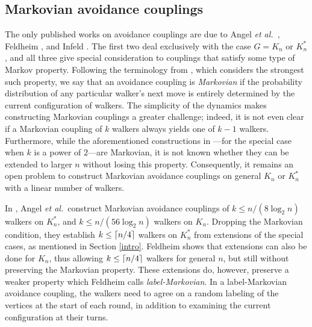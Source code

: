 \documentclass[11pt,reqno]{amsart} %
\numberwithin{equation}{section}
\theoremstyle{definition}
\DeclarePairedDelimiter\ceil{\lceil}{\rceil}
\begin{document}
\subsection{Markovian avoidance couplings} \label{Markovian}
The only published works on avoidance couplings are due to Angel \textit{et al.}~\cite{angel-holroyd-martin-wilson-winkler13}, Feldheim \cite{feldheim17}, and Infeld \cite{infeld16}.
The first two deal exclusively with the case $G = K_n$ or $K_n^*$, and all three give special consideration to couplings that satisfy some type of Markov property.
Following the terminology from \cite{angel-holroyd-martin-wilson-winkler13}, which considers the strongest such property, we say that an avoidance coupling is \textit{Markovian} if the probability distribution of any particular walker's next move is entirely determined by the current configuration of walkers.
The simplicity of the dynamics makes constructing Markovian couplings a greater challenge; indeed, it is not even clear if a Markovian coupling of $k$ walkers always yields one of $k-1$ walkers.
Furthermore, while the aforementioned constructions in \cite{angel-holroyd-martin-wilson-winkler13}---for the special case when $k$ is a power of $2$---are Markovian, it is not known whether they can be extended to larger $n$ without losing this property.
Consequently, it remains an open problem to construct Markovian avoidance couplings on general $K_n$ or $K_n^*$ with a linear number of walkers.

In \cite[Theorem 7.1]{angel-holroyd-martin-wilson-winkler13}, Angel \textit{et al.}~construct Markovian  avoidance couplings of $k \leq n/(8\log_2 n)$ walkers on $K_n^*$, and $k\leq n/(56\log_2 n)$ walkers on $K_n$.
Dropping the Markovian condition, they establish $k \leq \ceil{n/4}$ walkers on $K_n^*$ from extensions of the special cases, %
as mentioned in Section \ref{intro}.
Feldheim \cite[Theorem 1.1]{feldheim17} shows that extensions can also be done for $K_n$, thus allowing $k \leq \ceil{n/4}$ walkers for general $n$, but still without preserving the Markovian property.
These extensions do, however, preserve a weaker property which Feldheim calls \textit{label-Markovian}.
In a label-Markovian avoidance coupling, the walkers need to agree on a random labeling of the vertices at the start of each round, in addition to examining the current configuration at their turns.
\end{document}

